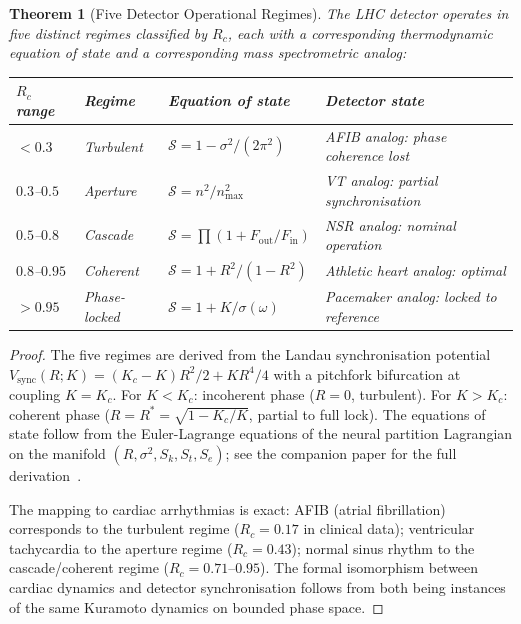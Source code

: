 \documentclass[twocolumn,10pt,a4paper]{article}
\theoremstyle{thmstyle}
\newtheorem{theorem}{Theorem}[section]
\theoremstyle{definition}
\theoremstyle{remark}
\begin{document}
\begin{theorem}[Five Detector Operational Regimes]
\label{thm:five_regimes}
The LHC detector operates in five distinct regimes classified by $R_c$,
each with a corresponding thermodynamic equation of state and a
corresponding mass spectrometric analog:

\begin{center}\small
\begin{tabular}{lllp{2.5cm}}
\toprule
$R_c$ range & Regime & Equation of state & Detector state \\
\midrule
$< 0.3$ & Turbulent & $\mathcal{S} = 1 - \sigma^2/(2\pi^2)$ & AFIB analog: phase coherence lost \\
$0.3$--$0.5$ & Aperture & $\mathcal{S} = n^2/n_{\max}^2$ & VT analog: partial synchronisation \\
$0.5$--$0.8$ & Cascade & $\mathcal{S} = \prod(1 + F_{\mathrm{out}}/F_{\mathrm{in}})$ & NSR analog: nominal operation \\
$0.8$--$0.95$ & Coherent & $\mathcal{S} = 1 + R^2/(1-R^2)$ & Athletic heart analog: optimal \\
$> 0.95$ & Phase-locked & $\mathcal{S} = 1 + K/\sigma(\omega)$ & Pacemaker analog: locked to reference \\
\bottomrule
\end{tabular}
\end{center}
\end{theorem}

\begin{proof}
The five regimes are derived from the Landau synchronisation potential
$V_{\mathrm{sync}}(R; K) = (K_c - K)R^2/2 + KR^4/4$ with a pitchfork
bifurcation at coupling $K = K_c$.
For $K < K_c$: incoherent phase ($R = 0$, turbulent).
For $K > K_c$: coherent phase ($R = R^* = \sqrt{1-K_c/K}$, partial to full lock).
The equations of state follow from the Euler-Lagrange equations of the
neural partition Lagrangian on the manifold $(R, \sigma^2, S_k, S_t, S_e)$;
see the companion paper for the full derivation~\citep{companion:regimes}.

The mapping to cardiac arrhythmias is exact: AFIB (atrial fibrillation)
corresponds to the turbulent regime ($R_c = 0.17$ in clinical data);
ventricular tachycardia to the aperture regime ($R_c = 0.43$);
normal sinus rhythm to the cascade/coherent regime ($R_c = 0.71$--$0.95$).
The formal isomorphism between cardiac dynamics and detector synchronisation
follows from both being instances of the same Kuramoto dynamics on bounded
phase space.
\end{proof}
\end{document}
